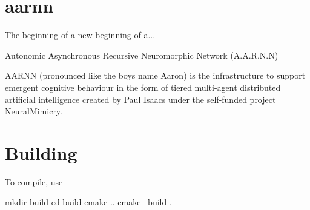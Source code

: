 \href{https://travis-ci.org/isaacstechnology/aarnn}{\tt } \href{https://ci.appveyor.com/project/isaacstechnology/aarnn/branch/master}{\tt } \href{https://flattr.com/submit/auto?user_id=isaacstechnology&url=https://github.com/isaacstechnology/aarnn&title=AARNN&language=&tags=github&category=software}{\tt } \section*{aarnn}

The beginning of a new beginning of a...

Autonomic Asynchronous Recursive Neuromorphic Network (A.\+A.\+R.\+N.\+N)

A\+A\+R\+NN (pronounced like the boy\textquotesingle{}s name Aaron) is the infrastructure to support emergent cognitive behaviour in the form of tiered multi-\/agent distributed artificial intelligence created by Paul Isaac\textquotesingle{}s under the self-\/funded project Neural\+Mimicry.

\section*{Building}

To compile, use \begin{DoxyVerb}mkdir build
cd build
cmake ..
cmake --build .\end{DoxyVerb}
 